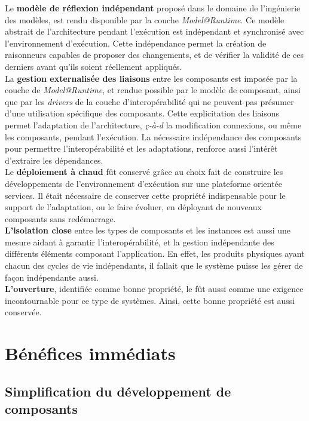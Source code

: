 Le {\bf modèle de réflexion indépendant} proposé dans le domaine de l'ingénierie des modèles, est rendu disponible par la couche {\it Model@Runtime}. Ce modèle abstrait de l'architecture pendant l'exécution est indépendant et synchronisé avec l'environnement d'exécution. Cette indépendance permet la création de raisonneurs capables de proposer des changements, et de vérifier la validité de ces derniers avant qu'ils soient réellement appliqués.\\
La {\bf gestion externalisée des liaisons} entre les composants est imposée par la couche de \textit{Model@Runtime}, et rendue possible par le modèle de composant, ainsi que par les {\it drivers} de la couche d'interopérabilité qui ne peuvent pas présumer d'une utilisation spécifique des composants. Cette explicitation des liaisons permet l'adaptation de l'architecture, \emph{ç-à-d} la modification connexions, ou même les composants, pendant l'exécution. La nécessaire indépendance des composants pour permettre l'interopérabilité et les adaptations, renforce aussi l'intér\^et d'extraire les dépendances.\\
Le {\bf déploiement à chaud} fût conservé grâce au choix fait de construire les développements de l'environnement d'exécution sur une plateforme orientée services. Il était nécessaire de conserver cette propriété indispensable pour le support de l'adaptation, ou le faire évoluer, en déployant de nouveaux composants sans redémarrage.\\
{\bf L'isolation close} entre les types de composants et les instances est aussi une mesure aidant à garantir l'interopérabilité, et la gestion indépendante des différents éléments composant l'application. En effet, les produits physiques ayant chacun des cycles de vie indépendants, il fallait que le système puisse les gérer de façon indépendante aussi.\\
{\bf L'ouverture}, identifiée comme bonne propriété, le fût aussi comme une exigence incontournable pour ce type de systèmes. Ainsi, cette bonne propriété est aussi conservée.

\section{Bénéfices immédiats}

\subsection{Simplification du développement de composants}

